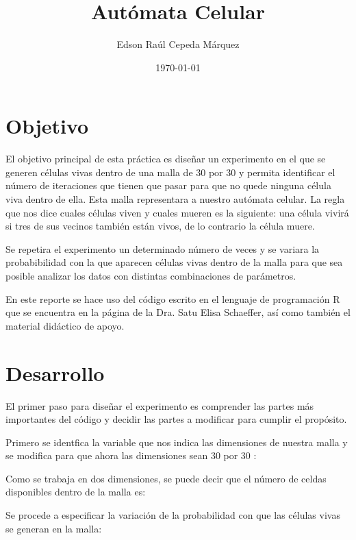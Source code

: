 \documentclass{article}
\author{Edson Raúl Cepeda Márquez}
\title{Autómata Celular}
\date{\today}
\begin{document}
\maketitle

\section{Objetivo}
El objetivo principal de esta práctica es diseñar un experimento en el que se generen células vivas dentro de una malla de 30 por 30 y permita identificar el número de iteraciones que tienen que pasar para que no quede ninguna célula viva dentro de ella. Esta malla representara a nuestro autómata celular. La regla que nos dice cuales células viven y cuales mueren es la siguiente: una célula vivirá si tres de sus vecinos también están vivos, de lo contrario la célula muere.

Se repetira el experimento un determinado número de veces y se variara la probabibilidad con la que aparecen células vivas dentro de la malla para que sea posible analizar los datos con distintas combinaciones de parámetros.

En este reporte se hace uso del código escrito en el lenguaje de programación R \cite{r} que se encuentra en la página \cite{satu} de la Dra. Satu Elisa Schaeffer, así como también el material didáctico de apoyo.

\section{Desarrollo}
El primer paso para diseñar el experimento es comprender las partes más importantes del código y decidir las partes a modificar para cumplir el propósito.

Primero se identfica la variable que nos indica las dimensiones de nuestra malla y se modifica para que ahora las dimensiones sean 30 por 30 :



Como se trabaja en dos dimensiones, se puede decir que el número de celdas disponibles dentro de la malla es:



Se procede a especificar la variación de la probabilidad con que las células vivas se generan en la malla:



\end{document}
